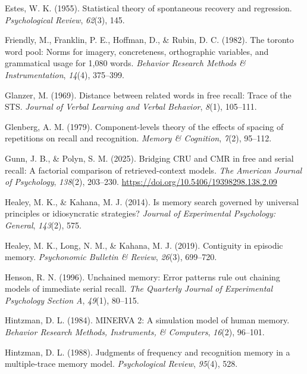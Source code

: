 \documentclass[
  man,
  floatsintext,
  longtable,
  nolmodern,
  notxfonts,
  notimes,
  draftfirst,
  colorlinks=true,linkcolor=blue,citecolor=blue,urlcolor=blue]{apa7}
\newlength{\cslhangindent}
\newenvironment{CSLReferences}[2] %
 {\begin{list}{}{%
  \setlength{\itemindent}{0pt}
  \setlength{\leftmargin}{0pt}
  \setlength{\parsep}{0pt}
  \ifodd #1
   \setlength{\leftmargin}{\cslhangindent}
   \setlength{\itemindent}{-1\cslhangindent}
  \fi
  \setlength{\itemsep}{#2\baselineskip}}}
 {\end{list}}
\begin{document}
\begin{CSLReferences}{1}{0}
Estes, W. K. (1955). Statistical theory of spontaneous recovery and
regression. \emph{Psychological Review}, \emph{62}(3), 145.

Friendly, M., Franklin, P. E., Hoffman, D., \& Rubin, D. C. (1982). The
toronto word pool: Norms for imagery, concreteness, orthographic
variables, and grammatical usage for 1,080 words. \emph{Behavior
Research Methods \& Instrumentation}, \emph{14}(4), 375--399.

Glanzer, M. (1969). Distance between related words in free recall: Trace
of the STS. \emph{Journal of Verbal Learning and Verbal Behavior},
\emph{8}(1), 105--111.

Glenberg, A. M. (1979). Component-levels theory of the effects of
spacing of repetitions on recall and recognition. \emph{Memory \&
Cognition}, \emph{7}(2), 95--112.

Gunn, J. B., \& Polyn, S. M. (2025). Bridging CRU and CMR in free and
serial recall: A factorial comparison of retrieved-context models.
\emph{The American Journal of Psychology}, \emph{138}(2), 203--230.
\url{https://doi.org/10.5406/19398298.138.2.09}

Healey, M. K., \& Kahana, M. J. (2014). Is memory search governed by
universal principles or idiosyncratic strategies? \emph{Journal of
Experimental Psychology: General}, \emph{143}(2), 575.

Healey, M. K., Long, N. M., \& Kahana, M. J. (2019). Contiguity in
episodic memory. \emph{Psychonomic Bulletin \& Review}, \emph{26}(3),
699--720.

Henson, R. N. (1996). Unchained memory: Error patterns rule out chaining
models of immediate serial recall. \emph{The Quarterly Journal of
Experimental Psychology Section A}, \emph{49}(1), 80--115.

Hintzman, D. L. (1984). MINERVA 2: A simulation model of human memory.
\emph{Behavior Research Methods, Instruments, \& Computers},
\emph{16}(2), 96--101.

Hintzman, D. L. (1988). Judgments of frequency and recognition memory in
a multiple-trace memory model. \emph{Psychological Review},
\emph{95}(4), 528.


\end{CSLReferences}
\end{document}
